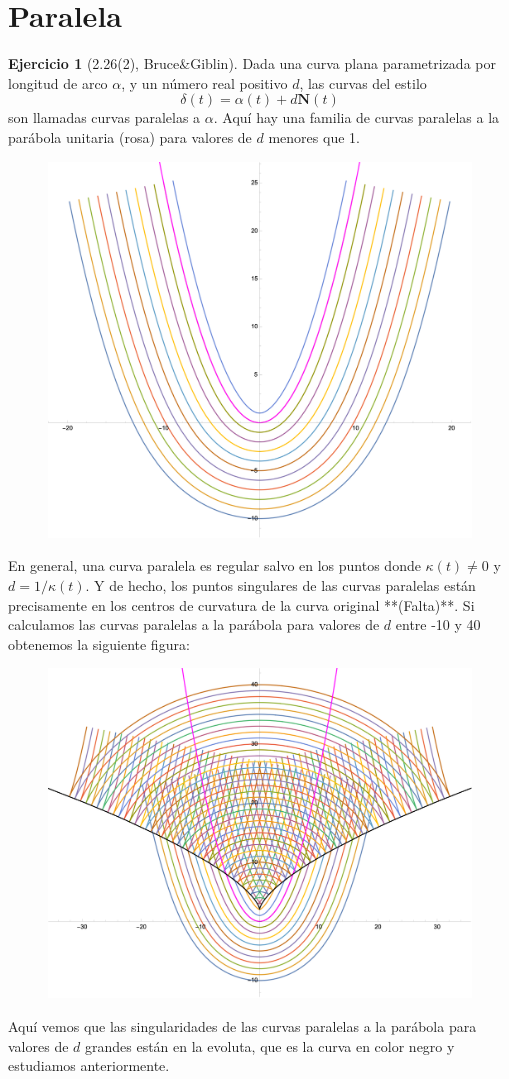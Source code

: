 \documentclass[spanish]{book}
\theoremstyle{definition}
\newtheorem*{ejer}{Ejercicio}
\begin{document}
\section{Paralela}
\begin{ejer}[2.26(2), Bruce\&Giblin]
	Dada una curva plana parametrizada por longitud de arco $\alpha$, y un número real positivo $d$, las curvas del estilo
	\[\delta(t)=\alpha(t)+d\mathbf{N}(t)\]
	son llamadas curvas paralelas a $\alpha$. Aquí hay una familia de curvas paralelas a la parábola unitaria (rosa) para valores de $d$ menores que 1.
	\begin{figure}[H]
		\centering
		\includegraphics[width=0.7\linewidth]{curvas10}
	\end{figure}
	En general, una curva paralela es regular salvo en los puntos donde $\kappa(t)\neq0$ y $d=1/\kappa(t)$. Y de hecho, los puntos singulares de las curvas paralelas están precisamente en los centros de curvatura de la curva original **(Falta)**. Si calculamos las curvas paralelas a la parábola para valores de $d$ entre -10 y 40 obtenemos la siguiente figura:
	\begin{figure}[H]
		\centering
		\includegraphics[width=0.7\linewidth]{curvas11}
	\end{figure}
	Aquí vemos que las singularidades de las curvas paralelas a la parábola para valores de $d$ grandes están en la evoluta, que es la curva en color negro y estudiamos anteriormente.
\end{ejer}
\end{document}
